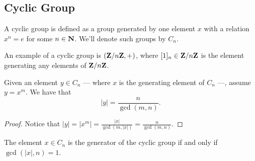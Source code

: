 \subsection{Cyclic Group}

\begin{definition}\label{def: cyclic-grp}
  A cyclic group is defined as a group generated by one element \(x\) with a
  relation \(x^n = e\) for some \(n \in \mathbf{N}\). We'll denote such groups by
  \(C_n\).
\end{definition}

\begin{example}
  An example of a cyclic group is \((\mathbf{Z}/n\mathbf{Z}, +)\), where \([1]_n \in \mathbf{Z}/n\mathbf{Z}\) is
  the element generating any elements of \(\mathbf{Z}/n\mathbf{Z}\).
\end{example}

\begin{proposition}
  Given an element \(y \in C_n\) --- where \(x\) is the generating element of
  \(C_n\) ---, assume \(y = x^m\). We have that
  \[
    |y| = \frac n {\operatorname{gcd}(m, n)}.
  \]
\end{proposition}

\begin{proof}
  Notice that \(|y| = |x^m| = \frac{|x|}{\operatorname{gcd}(m, |x|)} = \frac n
  {\operatorname{gcd}(m, n)}\).
\end{proof}

\begin{corollary}
  The element \(x \in C_n\) is the generator of the cyclic group if and only if
  \(\operatorname{gcd}(|x|, n) = 1\).
\end{corollary}
